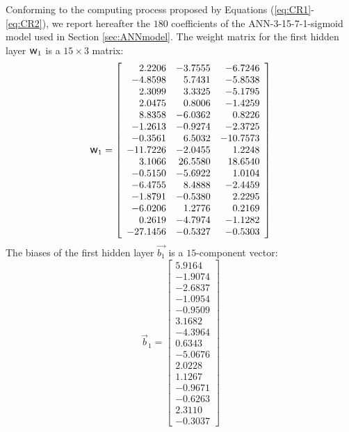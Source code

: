 \documentclass[twoside,english,1p,final,sort&compress]{elsarticle}
\theoremstyle{plain}
\DeclareRobustCommand{\w}{\mbox{\large\ensuremath{\mathsf{w}}}}
\begin{document}
Conforming to the computing process proposed by Equations (\ref{eq:CR1}-\ref{eq:CR2}), we report hereafter the $180$ coefficients of the ANN-3-15-7-1-sigmoid model used in Section \ref{sec:ANNmodel}.
The weight matrix for the first hidden layer $\w_1$ is a $15\times3$ matrix:
\begin{equation*}
\w_1 = \left[
\begin{array}{rrr}
	2.2206   & -3.7555 & -6.7246  \\
	-4.8598  & 5.7431  & -5.8538  \\
	2.3099   & 3.3325  & -5.1795  \\
	2.0475   & 0.8006  & -1.4259  \\
	8.8358   & -6.0362 & 0.8226   \\
	-1.2613  & -0.9274 & -2.3725  \\
	-0.3561  & 6.5032  & -10.7573 \\
	-11.7226 & -2.0455 & 1.2248   \\
	3.1066   & 26.5580 & 18.6540  \\
	-0.5150  & -5.6922 & 1.0104   \\
	-6.4755  & 8.4888  & -2.4459  \\
	-1.8791  & -0.5380 & 2.2295   \\
	-6.0206  & 1.2776  & 0.2169   \\
	0.2619   & -4.7974 & -1.1282  \\
	-27.1456 & -0.5327 & -0.5303
\end{array}\right]
\end{equation*}
The biases of the first hidden layer $\overrightarrow{b_1}$ is a $15$-component vector:
\begin{equation*}
\overrightarrow{b}_1 = \left[
\begin{array}{r}
	5.9164  \\
	-1.9074 \\
	-2.6837 \\
	-1.0954 \\
	-0.9509 \\
	3.1682  \\
	-4.3964 \\
	0.6343  \\
	-5.0676 \\
	2.0228  \\
	1.1267  \\
	-0.9671 \\
	-0.6263 \\
	2.3110  \\
	-0.3037
\end{array}\right]
\end{equation*}
\end{document}
